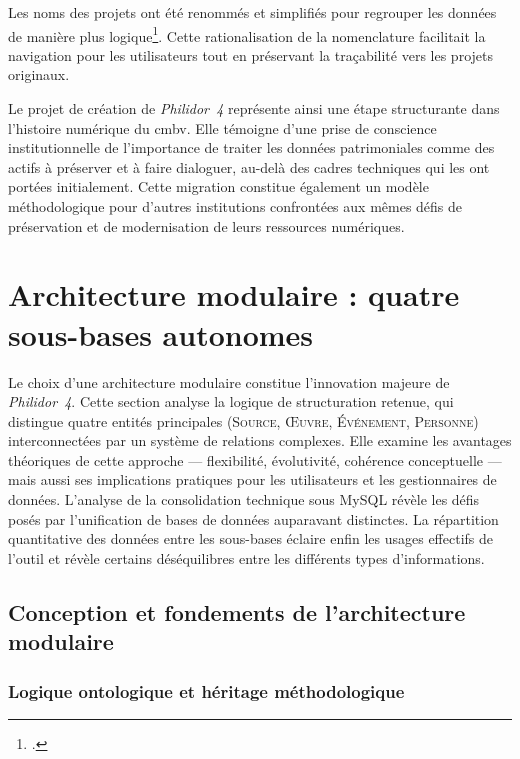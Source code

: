 Les noms des projets ont été renommés et simplifiés pour regrouper les données de manière plus logique\footcite{laurentguilloRapportMigrationAnciennes2022}. Cette rationalisation de la nomenclature facilitait la navigation pour les utilisateurs tout en préservant la traçabilité vers les projets originaux.

Le projet de création de \textit{Philidor~4} représente ainsi une étape structurante dans l'histoire numérique du \gls{cmbv}. Elle témoigne d'une prise de conscience institutionnelle de l'importance de traiter les données patrimoniales comme des actifs à préserver et à faire dialoguer, au-delà des cadres techniques qui les ont portées initialement. Cette migration constitue également un modèle méthodologique pour d'autres institutions confrontées aux mêmes défis de préservation et de modernisation de leurs ressources numériques.

\section{Architecture modulaire : quatre sous-bases autonomes}

Le choix d'une architecture modulaire constitue l'innovation majeure de \textit{Philidor~4}. Cette section analyse la logique de structuration retenue, qui distingue quatre entités principales (\textsc{Source}, \textsc{Œuvre}, \textsc{Événement}, \textsc{Personne}) interconnectées par un système de relations complexes. Elle examine les avantages théoriques de cette approche --- flexibilité, évolutivité, cohérence conceptuelle --- mais aussi ses implications pratiques pour les utilisateurs et les gestionnaires de données. L'analyse de la consolidation technique sous MySQL révèle les défis posés par l'unification de bases de données auparavant distinctes. La répartition quantitative des données entre les sous-bases éclaire enfin les usages effectifs de l'outil et révèle certains déséquilibres entre les différents types d'informations.

\subsection{Conception et fondements de l'architecture modulaire}

\subsubsection{Logique ontologique et héritage méthodologique}

